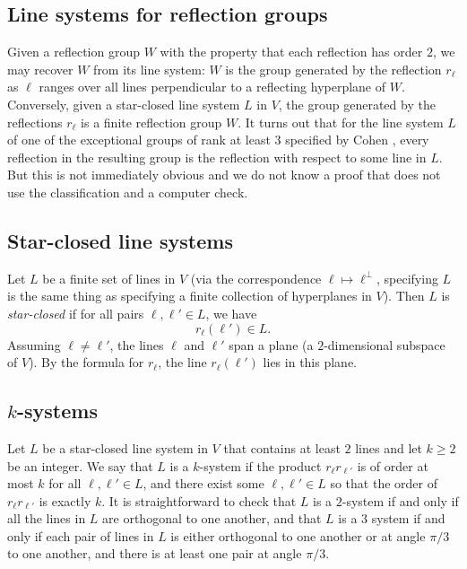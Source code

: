 \documentclass[11pt, reqno]{amsart}
\numberwithin{equation}{section}
\theoremstyle{definition}
\theoremstyle{plain}
\begin{document}
\subsection{Line systems for reflection groups}

Given a reflection group $W$ with the property that each reflection has order $2$, we may recover $W$ from its line system: $W$ is the group generated by the reflection $r_\ell$ as $\ell$ ranges over all lines perpendicular to a reflecting hyperplane of $W$. Conversely, given a star-closed line system $L$ in $V$, the group generated by the reflections $r_\ell$ is a finite reflection group $W$. It turns out that for the line system $L$ of one of the exceptional groups of rank at least $3$ specified by Cohen \cite{Coh}, every reflection in the resulting group is the reflection with respect to some line in $L$. But this is not immediately obvious and we do not know a proof that does not use the classification and a computer check.

\subsection{Star-closed line systems}

Let $L$ be a finite set of lines in $V$ (via the correspondence $\ell \mapsto \ell^\perp$, specifying $L$ is the same thing as specifying a finite collection of hyperplanes in $V$). Then $L$ is \emph{star-closed} if for all pairs $\ell,\ell' \in L$, we have 
$$r_\ell(\ell') \in L.$$ Assuming $\ell \neq \ell'$, the lines $\ell$ and $\ell'$ span a plane (a $2$-dimensional subspace of $V$). By the formula for $r_\ell$, the line $r_\ell(\ell')$ lies in this plane. 

\subsection{$k$-systems} Let $L$ be a star-closed line system in $V$ that contains at least $2$ lines and let $k \geq 2$ be an integer. We say that $L$ is a $k$-system if the product $r_\ell r_{\ell'}$ is of order at most $k$ for all $\ell,\ell' \in L$, and there exist some $\ell,\ell' \in L$ so that the order of $r_\ell r_{\ell'}$ is exactly $k$. It is straightforward to check that $L$ is a $2$-system if and only if all the lines in $L$ are orthogonal to one another, and that $L$ is a $3$ system if and only if each pair of lines in $L$ is either orthogonal to one another or at angle $\pi/3$ to one another, and there is at least one pair at angle $\pi/3$.
\end{document}
